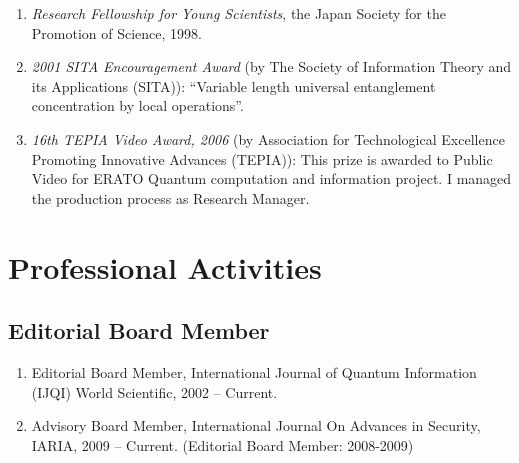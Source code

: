 \begin{enumerate}
\item \textit{Research Fellowship for Young Scientists}, 
the Japan Society for the Promotion of Science,
1998.

\item \textit{2001 SITA Encouragement Award} (by The Society of Information Theory and its Applications (SITA)):
``Variable length universal entanglement concentration by local operations''.

\item \textit{16th TEPIA Video Award, 2006}
(by Association for Technological Excellence Promoting Innovative Advances (TEPIA)):
This prize is awarded to 
Public Video for ERATO Quantum computation and information project.
I managed the production process as Research Manager.

\end{enumerate}

\section{Professional Activities}

\subsection{Editorial Board Member}
\begin{enumerate}
\item Editorial Board Member, International Journal of Quantum Information (IJQI) World Scientific, 2002 -- Current.
\item Advisory Board Member, International Journal On Advances in Security, IARIA, 2009 -- Current. (Editorial Board Member: 2008-2009)
\end{enumerate}

